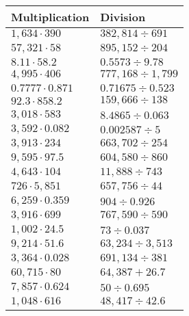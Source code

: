 \begin{longtable}[]{@{}ll@{}}
\toprule
Multiplication & Division\tabularnewline
\midrule
\endhead
\(1,634\cdot390\) & \(382,814÷691\)\tabularnewline
\(57,321\cdot58\) & \(895,152÷204\)\tabularnewline
\(8.11\cdot58.2\) & \(0.5573÷9.78\)\tabularnewline
\(4,995\cdot406\) & \(777,168÷1,799\)\tabularnewline
\(0.7777\cdot0.871\) & \(0.71675÷0.523\)\tabularnewline
\(92.3\cdot858.2\) & \(159,666÷138\)\tabularnewline
\(3,018\cdot583\) & \(8.4865÷0.063\)\tabularnewline
\(3,592\cdot0.082\) & \(0.002587÷5\)\tabularnewline
\(3,913\cdot234\) & \(663,702÷254\)\tabularnewline
\(9,595\cdot97.5\) & \(604,580÷860\)\tabularnewline
\(4,643\cdot104\) & \(11,888÷743\)\tabularnewline
\(726\cdot5,851\) & \(657,756÷44\)\tabularnewline
\(6,259\cdot0.359\) & \(904÷0.926\)\tabularnewline
\(3,916\cdot699\) & \(767,590÷590\)\tabularnewline
\(1,002\cdot24.5\) & \(73÷0.037\)\tabularnewline
\(9,214\cdot51.6\) & \(63,234÷3,513\)\tabularnewline
\(3,364\cdot0.028\) & \(691,134÷381\)\tabularnewline
\(60,715\cdot80\) & \(64,387 +26.7\)\tabularnewline
\(7,857\cdot0.624\) & \(50÷0.695\)\tabularnewline
\(1,048\cdot616\) & \(48,417÷42.6\)\tabularnewline
\bottomrule
\end{longtable}
